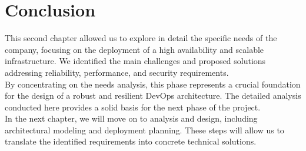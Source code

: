 \documentclass[a4paper,12pt]{report}
\begin{document}
\section{Conclusion}
\begin{doublespace}
\hspace{1cm}This second chapter allowed us to explore in detail the specific needs of the company, focusing on the deployment of a high availability and scalable infrastructure. We identified the main challenges and proposed solutions addressing reliability, performance, and security requirements. \\

By concentrating on the needs analysis, this phase represents a crucial foundation for the design of a robust and resilient DevOps architecture. The detailed analysis conducted here provides a solid basis for the next phase of the project. \\

In the next chapter, we will move on to analysis and design, including architectural modeling and deployment planning. These steps will allow us to translate the identified requirements into concrete technical solutions. 
\end{doublespace}
\newpage

\renewcommand{\headrulewidth}{1pt}
\fancyhead[R]{\hspace*{4cm}}
\end{document}
